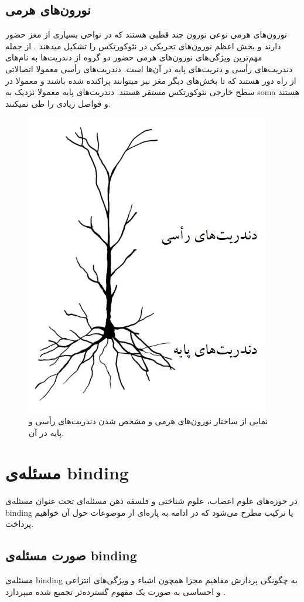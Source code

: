\documentclass[12pt]{report}
\begin{document}
	
	\subsection{نورون‌های هرمی}
	
	نورون‌های هرمی نوعی نورون چند قطبی هستند که در نواحی بسیاری از مغز حضور دارند و بخش اعظم نورون‌های تحریکی در نئوکورتکس را تشکیل میدهند \cite{Hawkins2016}.
	از جمله مهم‌ترین ویژگی‌های نورون‌های هرمی حضور دو گروه از دندریت‌ها به نام‌های دندریت‌های رأسی و دنریت‌های پایه در آن‌ها است.
	دندریت‌های رأسی معمولا اتصالاتی از راه دور هستند که تا بخش‌های دیگر مغز نیز میتوانند پراکنده شده باشند و معمولا در سطح خارجی نئوکورتکس مستقر هستند\cite{MEGIAS2001527}. دندریت‌‌های پایه معمولا نزدیک به \gls{soma} هستند و فواصل زیادی را طی نمیکنند.
	
	\begin{figure}[H]
		\centering
		\includegraphics[width=0.5\linewidth]{pyramidal.png}
		\caption[NS]{
			نمایی از ساختار نورون‌های هرمی و مشخص شدن دندریت‌های رأسی و پایه در آن.
		}
		\label{fig:pyramidal}
	\end{figure}
	
	\section{مسئله‌ی \gls{binding}}
	
	در حوزه‌های علوم اعصاب، علوم شناختی و فلسفه ذهن مسئله‌ای تحت عنوان مسئله‌ی \gls{binding}
	یا ترکیب 
	مطرح می‌شود که در ادامه به پاره‌ای از موضوعات حول آن خواهیم پرداخت.
	
	\subsection{صورت مسئله‌ی \gls{binding}}
	مسئله‌ی \gls{binding} به چگونگی پردازش مفاهیم مجزا همچون اشیاء و ویژگی‌های انتزاعی و احساسی به صورت یک مفهوم گسترده‌تر تجمیع شده میپردازد
	\cite{REVONSUO1999123}.
	
\end{document}

